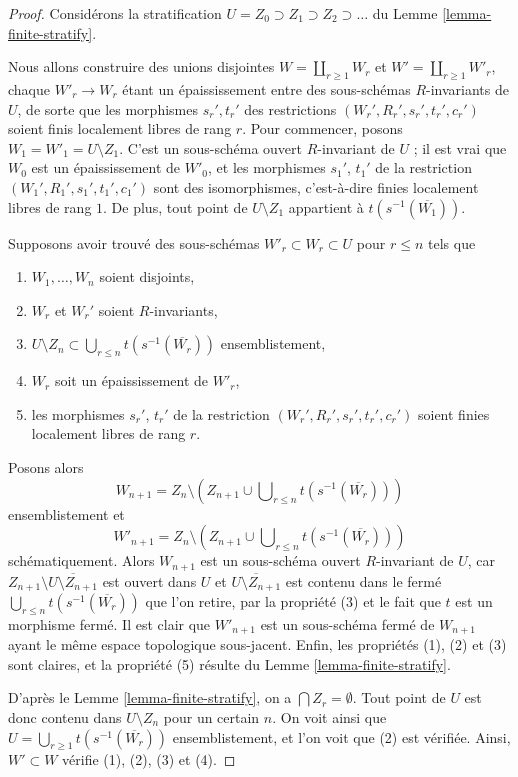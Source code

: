 \begin{proof}
Considérons la stratification $U = Z_0 \supset Z_1 \supset Z_2 \supset \ldots$
du Lemme \ref{lemma-finite-stratify}.

\medskip\noindent
Nous allons construire des unions disjointes $W = \coprod_{r \geq 1} W_r$ et
$W' = \coprod_{r \geq 1} W'_r$, chaque $W'_r \to W_r$ étant un épaississement
entre des sous-schémas $R$-invariants de $U$, de sorte que les morphismes
$s_r', t_r'$ des restrictions $(W_r', R_r', s_r', t_r', c_r')$
soient finis localement libres de rang $r$. Pour commencer, posons
$W_1 = W'_1 = U \setminus Z_1$. C'est un sous-schéma ouvert $R$-invariant
de $U$ ; il est vrai que $W_0$ est un épaississement de $W'_0$,
et les morphismes $s_1'$, $t_1'$ de la
restriction $(W_1', R_1', s_1', t_1', c_1')$ sont des isomorphismes, c'est-à-dire
finies localement libres de rang $1$.
De plus, tout point de $U \setminus Z_1$ appartient à $t(s^{-1}(\overline{W_1}))$.

\medskip\noindent
Supposons avoir trouvé des sous-schémas $W'_r \subset W_r \subset U$ pour $r \leq n$
tels que
\begin{enumerate}
\item $W_1, \ldots, W_n$ soient disjoints,
\item $W_r$ et $W_r'$ soient $R$-invariants,
\item $U \setminus Z_n \subset \bigcup_{r \leq n} t(s^{-1}(\overline{W_r}))$
ensemblistement,
\item $W_r$ soit un épaississement de $W'_r$,
\item les morphismes $s_r'$, $t_r'$ de la restriction
$(W_r', R_r', s_r', t_r', c_r')$ soient finies localement libres de rang $r$.
\end{enumerate}
Posons alors
$$
W_{n + 1} = Z_n \setminus
\left(
Z_{n + 1} \cup \bigcup\nolimits_{r \leq n} t(s^{-1}(\overline{W_r}))
\right)
$$
ensemblistement et
$$
W'_{n + 1} = Z_n \setminus
\left(
Z_{n + 1} \cup \bigcup\nolimits_{r \leq n} t(s^{-1}(\overline{W_r}))
\right)
$$
schématiquement. Alors $W_{n + 1}$ est un sous-schéma ouvert $R$-invariant
de $U$, car $Z_{n + 1} \setminus \overline{U \setminus Z_{n + 1}}$
est ouvert dans $U$ et $\overline{U \setminus Z_{n + 1}}$ est contenu
dans le fermé $\bigcup\nolimits_{r \leq n} t(s^{-1}(\overline{W_r}))$
que l'on retire, par la propriété (3) et le fait que $t$ est un morphisme fermé.
Il est clair que $W'_{n + 1}$ est un sous-schéma fermé
de $W_{n + 1}$ ayant le même espace topologique sous-jacent.
Enfin, les propriétés (1), (2) et (3) sont claires, et la propriété (5) résulte du
Lemme \ref{lemma-finite-stratify}.

\medskip\noindent
D'après le Lemme \ref{lemma-finite-stratify}, on a $\bigcap Z_r = \emptyset$.
Tout point de $U$ est donc contenu dans $U \setminus Z_n$
pour un certain $n$. On voit ainsi que
$U = \bigcup_{r \geq 1} t(s^{-1}(\overline{W_r}))$
ensemblistement, et l'on voit que (2) est vérifiée.
Ainsi, $W' \subset W$ vérifie (1), (2), (3) et (4).
\end{proof}

